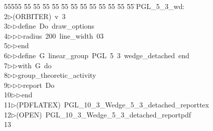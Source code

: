 %
%
\begin{tabbing}
55555 \= 55 \= 55 \= 55 \= 55 \= 55 \= 55 \= 55 \= 55 \= 55 \= 55 \= 55 \= 55 \= \>PGL\_5\_3\_wd:\\[0pt]
2\>$\triangleright$\>(ORBITER)\ v\ 3\ \\[0pt]
3\>$\triangleright$\>$\triangleright$\>define\ Do\ draw\_options\ \\[0pt]
4\>$\triangleright$\>$\triangleright$\>$\triangleright$\>radius\ 200\ line\_width\ 03\ \\[0pt]
5\>$\triangleright$\>$\triangleright$\>end\ \\[0pt]
6\>$\triangleright$\>$\triangleright$\>define\ G\ linear\_group\ PGL\ 5\ 3\ wedge\_detached\ end\ \\[0pt]
7\>$\triangleright$\>$\triangleright$\>with\ G\ do\ \\[0pt]
8\>$\triangleright$\>$\triangleright$\>group\_theoretic\_activity\ \\[0pt]
9\>$\triangleright$\>$\triangleright$\>$\triangleright$\>report\ Do\ \\[0pt]
10\>$\triangleright$\>$\triangleright$\>end\\[0pt]
11\>$\triangleright$\>(PDFLATEX)\ PGL\_10\_3\_Wedge\_5\_3\_detached\_reporttex\\[0pt]
12\>$\triangleright$\>(OPEN)\ PGL\_10\_3\_Wedge\_5\_3\_detached\_reportpdf\\[0pt]
13\>\end{tabbing}
